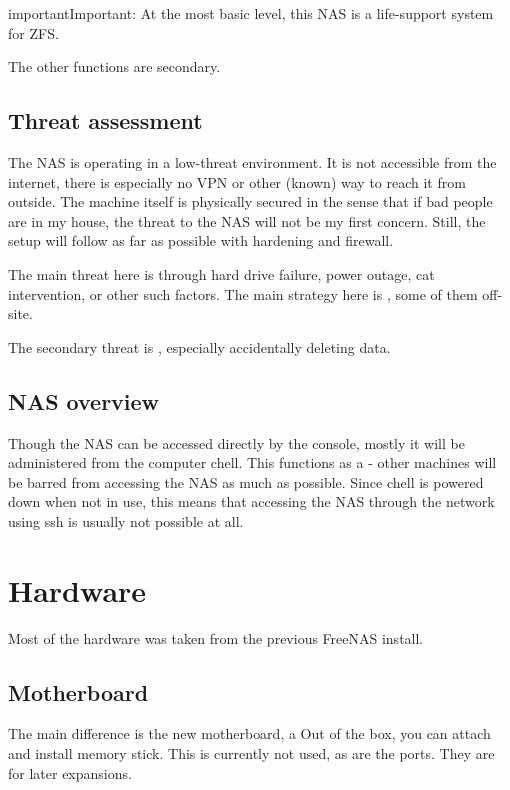 \documentclass[a4paper,10pt,english]{sphinxmanual}
\begin{document}
\begin{sphinxadmonition}{important}{Important:}
At the most basic level, this NAS is a life-support system for
ZFS.
\end{sphinxadmonition}

The other functions are secondary.


\section{Threat assessment}
\label{\detokenize{goals:threat-assessment}}
The NAS is operating in a low-threat environment. It is not accessible from the
internet, there is especially no VPN or other (known) way to reach it from
outside. The machine itself is physically secured in the sense that if bad
people are in my house, the threat to the NAS will not be my first concern.
Still, the setup will follow  as far as possible with hardening
and firewall.

The main threat here is  through hard drive failure, power outage,
cat intervention, or other such factors. The main strategy here is , some of them off-site.

The secondary threat is , especially accidentally deleting
data.


\section{NAS overview}
\label{\detokenize{goals:nas-overview}}
Though the NAS can be accessed directly by the console, mostly it will be
administered from the computer chell. This functions as a  - other
machines will be barred from accessing the NAS as much as possible. Since chell
is powered down when not in use, this means that accessing the NAS through the
network using ssh is usually not possible at all.


\chapter{Hardware}
\label{\detokenize{hardware:hardware}}\label{\detokenize{hardware::doc}}
Most of the hardware was taken from the previous FreeNAS install.


\section{Motherboard}
\label{\detokenize{hardware:motherboard}}
The main difference is the new motherboard, a 
Out of the box, you can attach  and install  memory stick. This is currently not used, as are the  ports. They are for later expansions.
\end{document}
